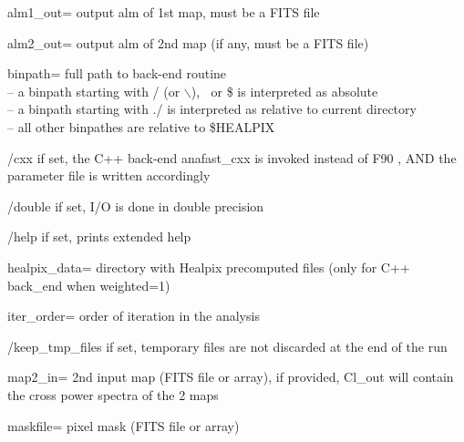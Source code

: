 \begin{keywords}
  \begin{kwlist}{} %
\item[alm1\_out=]   output alm of 1st map, must be a FITS file          

\item[alm2\_out=]   output alm of 2nd map (if any, must be a FITS file) 

\item[binpath=] full path to back-end routine \\
              -- a binpath starting with / (or $\backslash$), $~$ or \$ is interpreted as absolute\\
              -- a binpath starting with ./ is interpreted as relative to current directory\\
              -- all other binpathes are relative to \$HEALPIX

\item[/cxx] if set, the C++ back-end anafast\_cxx is invoked instead of F90 ,
           AND the parameter file is written accordingly

\item[/double]    if set, I/O is done in double precision 

\item[/help]      if set, prints extended help

\item[healpix\_data=] directory with Healpix precomputed files (only for C++ back\_end when weighted=1)

\item[iter\_order=] order of iteration in the analysis 

\item[/keep\_tmp\_files] if set, temporary files are not discarded at the end of the
                  run

\item[map2\_in=] 2nd input map (FITS file or array), if provided, Cl\_out will
  contain the cross power spectra of the 2 maps 

\item[maskfile=] pixel mask (FITS file or array)   


\end{kwlist}
\end{keywords}

